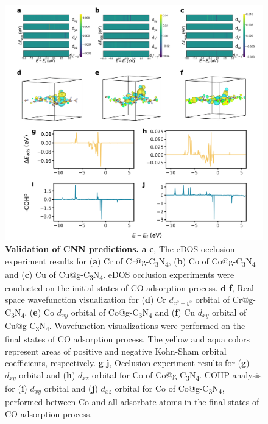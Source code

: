 \documentclass[a4paper, 12pt, titlepage]{article}
\begin{document}
    \begin{figure}[htbp]
        \centering
        \includegraphics[width=\textwidth]{main_fig4_validation.png}
        \caption{\textbf{Validation of CNN predictions.}
        \textbf{a}-\textbf{c}, The eDOS occlusion experiment results for
        (\textbf{a}) Cr of Cr@g-C\textsubscript{3}N\textsubscript{4},
        (\textbf{b}) Co of Co@g-C\textsubscript{3}N\textsubscript{4} and
        (\textbf{c}) Cu of Cu@g-C\textsubscript{3}N\textsubscript{4}.
        eDOS occlusion experiments were conducted on the initial states of CO adsorption process.
        \textbf{d}-\textbf{f}, Real-space wavefunction visualization for
        (\textbf{d}) Cr $d_{x^2-y^2}$ orbital of Cr@g-C\textsubscript{3}N\textsubscript{4},
        (\textbf{e}) Co $d_{xy}$ orbital of Co@g-C\textsubscript{3}N\textsubscript{4} and
        (\textbf{f}) Cu $d_{xy}$ orbital of Cu@g-C\textsubscript{3}N\textsubscript{4}.
        Wavefunction visualizations were performed on the final states of CO adsorption process.
        The yellow and aqua colors represent areas of positive and negative
        Kohn-Sham orbital coefficients, respectively.
        \textbf{g}-\textbf{j}, Occlusion experiment results for (\textbf{g}) $d_{xy}$ orbital
        and (\textbf{h}) $d_{xz}$ orbital for Co of Co@g-C\textsubscript{3}N\textsubscript{4}.
        COHP analysis for (\textbf{i}) $d_{xy}$ orbital and (\textbf{j}) $d_{xz}$ orbital for
        Co of Co@g-C\textsubscript{3}N\textsubscript{4}, performed between Co and
        all adsorbate atoms in the final states of CO adsorption process.}
        \label{main_fig4:validation}
    \end{figure}
\end{document}
